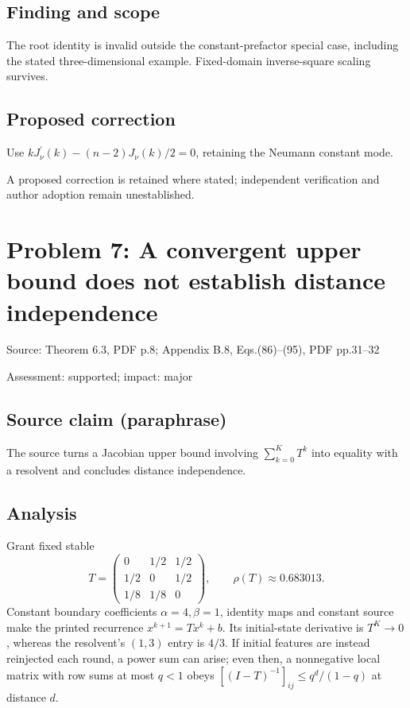 \documentclass[11pt]{article}
\begin{document}
\subsection*{Finding and scope}

The root identity is invalid outside the constant-prefactor special case, including the stated three-dimensional example. Fixed-domain inverse-square scaling survives.

\subsection*{Proposed correction}

Use \(kJ_\nu^{\prime}(k)-(n-2)J_\nu(k)/2=0\), retaining the Neumann constant mode.

A proposed correction is retained where stated; independent verification and author adoption remain unestablished.

\section*{Problem 7: A convergent upper bound does not establish distance independence}

Source: Theorem 6.3, PDF p.8; Appendix B.8, Eqs.(86)–(95), PDF pp.31–32

Assessment: supported; impact: major

\subsection*{Source claim (paraphrase)}

The source turns a Jacobian upper bound involving \(\sum_{k=0}^K T^k\) into equality with a resolvent and concludes distance independence.

\subsection*{Analysis}

Grant fixed stable \[T=\begin{pmatrix}0&1/2&1/2\\1/2&0&1/2\\1/8&1/8&0\end{pmatrix},\qquad \rho(T)\approx0.683013.\] Constant boundary coefficients \(\alpha=4,\beta=1\), identity maps and constant source make the printed recurrence \(x^{k+1}=Tx^k+b\). Its initial-state derivative is \(T^K\to0\), whereas the resolvent’s \((1,3)\) entry is \(4/3\). If initial features are instead reinjected each round, a power sum can arise; even then, a nonnegative local matrix with row sums at most \(q<1\) obeys \([(I-T)^{-1}]_{ij}\le q^d/(1-q)\) at distance \(d\).
\end{document}
